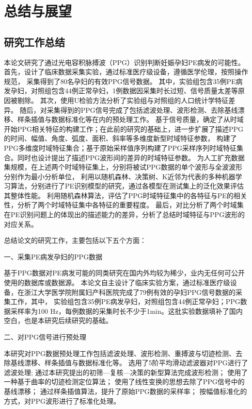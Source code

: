 \chapter{总结与展望}
\section{研究工作总结}
本论文研究了通过光电容积脉搏波（PPG）识别判断妊娠孕妇PE病发的可能性。首先，设计了临床数据采集实验，通过标准医疗级设备，遵循医学伦理，按照操作规范，
采集得到了80名孕妇的有效PPG信号数据。
其中，实验组包含35例PE病发孕妇，对照组包含44例正常孕妇，1例数据因采集时长过短、信号质量太差等原因被剔除。
其次，使用U检验方法分析了实验组与对照组的人口统计学特征差异。%
随后，对采集得到的PPG信号完成了包括滤波处理、波形检测、去除基线漂移、样条插值与数据标准化等在内的预处理工作。
基于信号质量，确定了从时域开始PPG相关特征的构建工作；在此前的研究的基础上，进一步扩展了描述PPG的时间、幅值、角度、弧度、面积、斜率等多维度新型时域特征参数，
构建了PPG多维度时域特征集合；基于原始采样值序列构建了PPG采样序列时域特征集合。同时也设计提出了描述PPG波形间的差异的时域特征参数。
为人工扩充数据集规模，在上述两个时域特征集上，分别将被试PPG数据的单个波形与全波波形分别作为最小分析单位，
利用以随机森林、决策树、K近邻为代表的多种机器学习算法，分别进行了PE识别模型的研究，通过各模型在测试集上的泛化效果评估其整体性能。
利用随机森林算法，评估了PPG时域特征集中的各特征与PE的相关性，分析了两个时域特征集中各特征的重要程度。
最后，对比分析了两个时域集在PE识别问题上的体现出的描述能力的差异，分析了总结时域特征与PPG波形的对应关系。


总结论文的研究工作，主要包括以下五个方面：

一、采集PE病发孕妇的PPG数据

基于PPG数据对PE病发可能的同类研究在国内外均较为稀少，业内无任何可公开使用的数据库或数据源。
本论文自主设计了临床实验方案，通过标准医疗级设备，在浙江大学医学院附属妇产科医院完成了79例有效的孕妇PPG信号数据的采集工作，其中，
实验组包含35例PE病发孕妇，对照组包含44例正常孕妇；PPG数据采样率为100 Hz，每例数据的采集时长不少于1min。这批实验数据填补了国内空白，也是本研究后续研究的基础。

二、对PPG信号进行预处理

本研究对PPG数据预处理工作包括滤波处理、波形检测、重搏波与切迹检测、去除基线漂移、样条插值与数据标准化等。
选用了5阶平均滑动滤波器对PPG进行了滤波处理;
通过本研究提出的初筛—复核—决策的新型算法完成波形检测；
使用了一种基于曲率的切迹检测定位算法；
使用了线性变换的思想去除了PPG信号中的基线漂移；
通过样条插值算法，提升了原始PPG数据的采样率；
按幅值标准化的方式，对PPG波形进行了标准化处理。

